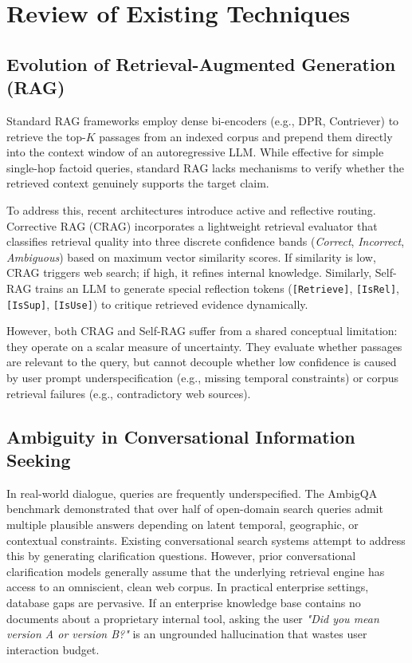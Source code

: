 \section{Review of Existing Techniques}
\label{sec:review_existing_techniques}

\subsection{Evolution of Retrieval-Augmented Generation (RAG)}
Standard RAG frameworks\cite{lewis2020retrieval} employ dense bi-encoders (e.g., DPR, Contriever) to retrieve the top-$K$ passages from an indexed corpus and prepend them directly into the context window of an autoregressive LLM. While effective for simple single-hop factoid queries, standard RAG lacks mechanisms to verify whether the retrieved context genuinely supports the target claim.

To address this, recent architectures introduce active and reflective routing. Corrective RAG (CRAG) \cite{yan2024corrective} incorporates a lightweight retrieval evaluator that classifies retrieval quality into three discrete confidence bands (\emph{Correct}, \emph{Incorrect}, \emph{Ambiguous}) based on maximum vector similarity scores. If similarity is low, CRAG triggers web search; if high, it refines internal knowledge. Similarly, Self-RAG\cite{asai2024self} trains an LLM to generate special reflection tokens (\texttt{[Retrieve]}, \texttt{[IsRel]}, \texttt{[IsSup]}, \texttt{[IsUse]}) to critique retrieved evidence dynamically. 

However, both CRAG and Self-RAG suffer from a shared conceptual limitation: they operate on a scalar measure of uncertainty. They evaluate whether passages are relevant to the query, but cannot decouple whether low confidence is caused by user prompt underspecification (e.g., missing temporal constraints) or corpus retrieval failures (e.g., contradictory web sources).

\subsection{Ambiguity in Conversational Information Seeking}
In real-world dialogue, queries are frequently underspecified. The AmbigQA benchmark\cite{min2020ambigqa} demonstrated that over half of open-domain search queries admit multiple plausible answers depending on latent temporal, geographic, or contextual constraints. Existing conversational search systems attempt to address this by generating clarification questions. However, prior conversational clarification models generally assume that the underlying retrieval engine has access to an omniscient, clean web corpus. In practical enterprise settings, database gaps are pervasive. If an enterprise knowledge base contains no documents about a proprietary internal tool, asking the user \textit{"Did you mean version A or version B?"} is an ungrounded hallucination that wastes user interaction budget.

